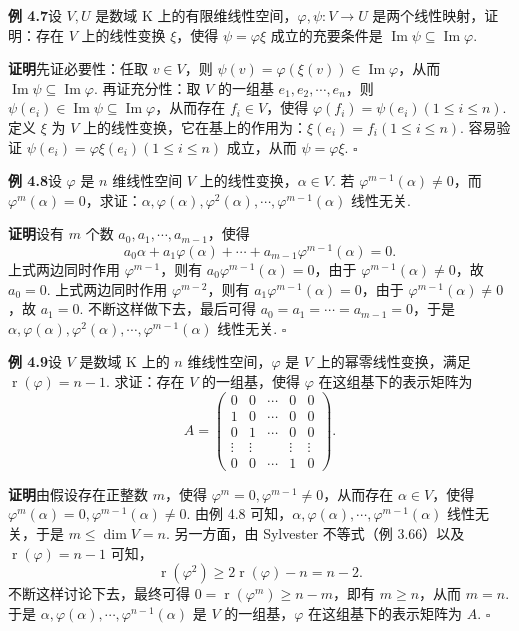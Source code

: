 \documentclass[UTF8, 12pt, fontset=fandol, oneside]{ctexart}
\begin{document}
\noindent\textbf{例 4.7}\quad 设 $V,U$ 是数域 $\mathrm{K}$ 上的有限维线性空间，$\varphi,\psi:V\to U$ 是两个线性映射，证明：存在 $V$ 上的线性变换 $\xi$，使得 $\psi=\varphi\xi$ 成立的充要条件是 $\operatorname{Im}\psi\subseteq\operatorname{Im}\varphi$.

\noindent\textbf{证明}\quad 先证必要性：任取 $v\in V$，则 $\psi(v)=\varphi(\xi(v))\in\operatorname{Im}\varphi$，从而 $\operatorname{Im}\psi\subseteq\operatorname{Im}\varphi$. 再证充分性：取 $V$ 的一组基 $e_1,e_2,\cdots,e_n$，则 $\psi(e_i)\in\operatorname{Im}\psi\subseteq\operatorname{Im}\varphi$，从而存在 $f_i\in V$，使得 $\varphi(f_i)=\psi(e_i)(1\le i\le n)$. 定义 $\xi$ 为 $V$ 上的线性变换，它在基上的作用为：$\xi(e_i)=f_i(1\le i\le n)$. 容易验证 $\psi(e_i)=\varphi\xi(e_i)(1\le i\le n)$ 成立，从而 $\psi=\varphi\xi$. $\square$

\noindent\textbf{例 4.8}\quad 设 $\varphi$ 是 $n$ 维线性空间 $V$ 上的线性变换，$\alpha\in V$. 若 $\varphi^{m-1}(\alpha)\ne0$，而 $\varphi^m(\alpha)=0$，求证：$\alpha,\varphi(\alpha),\varphi^2(\alpha),\cdots,\varphi^{m-1}(\alpha)$ 线性无关.

\noindent\textbf{证明}\quad 设有 $m$ 个数 $a_0,a_1,\cdots,a_{m-1}$，使得
\[
a_0\alpha+a_1\varphi(\alpha)+\cdots+a_{m-1}\varphi^{m-1}(\alpha)=0.
\]
上式两边同时作用 $\varphi^{m-1}$，则有 $a_0\varphi^{m-1}(\alpha)=0$，由于 $\varphi^{m-1}(\alpha)\ne0$，故 $a_0=0$. 上式两边同时作用 $\varphi^{m-2}$，则有 $a_1\varphi^{m-1}(\alpha)=0$，由于 $\varphi^{m-1}(\alpha)\ne0$，故 $a_1=0$. 不断这样做下去，最后可得 $a_0=a_1=\cdots=a_{m-1}=0$，于是 $\alpha,\varphi(\alpha),\varphi^2(\alpha),\cdots,\varphi^{m-1}(\alpha)$ 线性无关. $\square$

\noindent\textbf{例 4.9}\quad 设 $V$ 是数域 $\mathrm{K}$ 上的 $n$ 维线性空间，$\varphi$ 是 $V$ 上的幂零线性变换，满足 $\operatorname{r}(\varphi)=n-1$. 求证：存在 $V$ 的一组基，使得 $\varphi$ 在这组基下的表示矩阵为
\[
A=\left(\begin{array}{ccccc}
0 & 0 & \cdots & 0 & 0\\
1 & 0 & \cdots & 0 & 0\\
0 & 1 & \cdots & 0 & 0\\
\vdots & \vdots &        & \vdots & \vdots\\
0 & 0 & \cdots & 1 & 0
\end{array}\right).
\]

\noindent\textbf{证明}\quad 由假设存在正整数 $m$，使得 $\varphi^m=0,\varphi^{m-1}\ne0$，从而存在 $\alpha\in V$，使得 $\varphi^m(\alpha)=0,\varphi^{m-1}(\alpha)\ne0$. 由例 4.8 可知，$\alpha,\varphi(\alpha),\cdots,\varphi^{m-1}(\alpha)$ 线性无关，于是 $m\le\dim V=n$. 另一方面，由 Sylvester 不等式（例 3.66）以及 $\operatorname{r}(\varphi)=n-1$ 可知，
\[
\operatorname{r}(\varphi^2)\ge 2\operatorname{r}(\varphi)-n=n-2.
\]
不断这样讨论下去，最终可得 $0=\operatorname{r}(\varphi^m)\ge n-m$，即有 $m\ge n$，从而 $m=n$. 于是 $\alpha,\varphi(\alpha),\cdots,\varphi^{n-1}(\alpha)$ 是 $V$ 的一组基，$\varphi$ 在这组基下的表示矩阵为 $A$. $\square$
\end{document}
